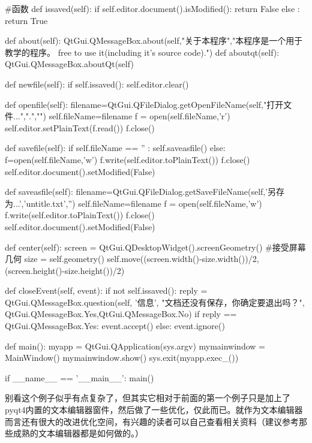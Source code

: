 \documentclass[12pt,oneside]{book}
\begin{document}
\begin{common-format}
\begin{tcbpython}[]
#函数
    def issaved(self):
        if  self.editor.document().isModified():
            return False
        else :
            return True

    def about(self):
        QtGui.QMessageBox.about(self,"关于本程序","本程序是一个用于教学的程序。
        \n\nFell free to use it\n(including it's source code).")
    def aboutqt(self):
        QtGui.QMessageBox.aboutQt(self)

    def newfile(self):
        if  self.issaved():
            self.editor.clear()


    def openfile(self):
        filename=QtGui.QFileDialog.getOpenFileName(self,"打开文件...",".","")
        self.fileName=filename
        f = open(self.fileName,'r')
        self.editor.setPlainText(f.read())
        f.close()

    def savefile(self):
        if self.fileName == '' :
            self.saveasfile()
        else:
            f=open(self.fileName,'w')
            f.write(self.editor.toPlainText())
            f.close()
        self.editor.document().setModified(False)

    def saveasfile(self):
        filename=QtGui.QFileDialog.getSaveFileName(self,'另存为...','untitle.txt','')
        self.fileName=filename
        f = open(self.fileName,'w')
        f.write(self.editor.toPlainText())
        f.close()
        self.editor.document().setModified(False)

    def center(self):
        screen = QtGui.QDesktopWidget().screenGeometry()
        #接受屏幕几何
        size =  self.geometry()
        self.move((screen.width()-size.width())/2,
        (screen.height()-size.height())/2)

    def closeEvent(self, event):
        if not self.issaved():
            reply = QtGui.QMessageBox.question(self, '信息',
            "文档还没有保存，你确定要退出吗？",
            QtGui.QMessageBox.Yes,QtGui.QMessageBox.No)
            if reply == QtGui.QMessageBox.Yes:
                event.accept()
            else:
                event.ignore()

def main():
    myapp = QtGui.QApplication(sys.argv)
    mymainwindow = MainWindow()
    mymainwindow.show()
    sys.exit(myapp.exec_())

if __name__ == '__main__':
    main()
\end{tcbpython}

别看这个例子似乎有点复杂了，但其实它相对于前面的第一个例子只是加上了pyqt4内置的文本编辑器窗件，然后做了一些优化，仅此而已。就作为文本编辑器而言还有很大的改进优化空间，有兴趣的读者可以自己查看相关资料（建议参考那些成熟的文本编辑器都是如何做的。）


\end{common-format}
\end{document}
